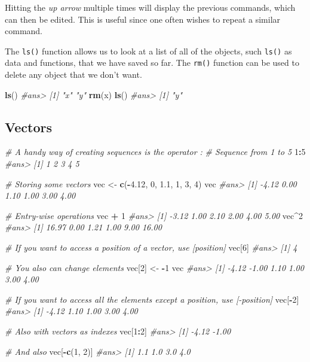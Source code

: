 \documentclass[]{book}
\newenvironment{Shaded}{\begin{snugshade}}{\end{snugshade}}
\newcommand{\KeywordTok}[1]{\textcolor[rgb]{0.13,0.29,0.53}{\textbf{#1}}}
\newcommand{\DecValTok}[1]{\textcolor[rgb]{0.00,0.00,0.81}{#1}}
\newcommand{\FloatTok}[1]{\textcolor[rgb]{0.00,0.00,0.81}{#1}}
\newcommand{\StringTok}[1]{\textcolor[rgb]{0.31,0.60,0.02}{#1}}
\newcommand{\CommentTok}[1]{\textcolor[rgb]{0.56,0.35,0.01}{\textit{#1}}}
\newcommand{\OperatorTok}[1]{\textcolor[rgb]{0.81,0.36,0.00}{\textbf{#1}}}
\newcommand{\NormalTok}[1]{#1}
\begin{document}
Hitting the \emph{up arrow} multiple times will display the previous
commands, which can then be edited. This is useful since one often
wishes to repeat a similar command.

The \texttt{ls()} function allows us to look at a list of all of the
objects, such \texttt{ls()} as data and functions, that we have saved so
far. The \texttt{rm()} function can be used to delete any object that we
don't want.

\begin{Shaded}
\begin{Highlighting}[]
\KeywordTok{ls}\NormalTok{()}
\CommentTok{#ans> [1] "x" "y"}
\KeywordTok{rm}\NormalTok{(x)}
\KeywordTok{ls}\NormalTok{()}
\CommentTok{#ans> [1] "y"}
\end{Highlighting}
\end{Shaded}

\subsection{Vectors}\label{vectors}

\begin{Shaded}
\begin{Highlighting}[]

\CommentTok{# A handy way of creating sequences is the operator :}
\CommentTok{# Sequence from 1 to 5}
\DecValTok{1}\OperatorTok{:}\DecValTok{5}
\CommentTok{#ans> [1] 1 2 3 4 5}

\CommentTok{# Storing some vectors}
\NormalTok{vec <-}\StringTok{ }\KeywordTok{c}\NormalTok{(}\OperatorTok{-}\FloatTok{4.12}\NormalTok{, }\DecValTok{0}\NormalTok{, }\FloatTok{1.1}\NormalTok{, }\DecValTok{1}\NormalTok{, }\DecValTok{3}\NormalTok{, }\DecValTok{4}\NormalTok{)}
\NormalTok{vec}
\CommentTok{#ans> [1] -4.12  0.00  1.10  1.00  3.00  4.00}

\CommentTok{# Entry-wise operations}
\NormalTok{vec }\OperatorTok{+}\StringTok{ }\DecValTok{1}
\CommentTok{#ans> [1] -3.12  1.00  2.10  2.00  4.00  5.00}
\NormalTok{vec}\OperatorTok{^}\DecValTok{2}
\CommentTok{#ans> [1] 16.97  0.00  1.21  1.00  9.00 16.00}

\CommentTok{# If you want to access a position of a vector, use [position]}
\NormalTok{vec[}\DecValTok{6}\NormalTok{]}
\CommentTok{#ans> [1] 4}

\CommentTok{# You also can change elements}
\NormalTok{vec[}\DecValTok{2}\NormalTok{] <-}\StringTok{ }\OperatorTok{-}\DecValTok{1}
\NormalTok{vec}
\CommentTok{#ans> [1] -4.12 -1.00  1.10  1.00  3.00  4.00}

\CommentTok{# If you want to access all the elements except a position, use [-position]}
\NormalTok{vec[}\OperatorTok{-}\DecValTok{2}\NormalTok{]}
\CommentTok{#ans> [1] -4.12  1.10  1.00  3.00  4.00}

\CommentTok{# Also with vectors as indexes}
\NormalTok{vec[}\DecValTok{1}\OperatorTok{:}\DecValTok{2}\NormalTok{]}
\CommentTok{#ans> [1] -4.12 -1.00}

\CommentTok{# And also}
\NormalTok{vec[}\OperatorTok{-}\KeywordTok{c}\NormalTok{(}\DecValTok{1}\NormalTok{, }\DecValTok{2}\NormalTok{)]}
\CommentTok{#ans> [1] 1.1 1.0 3.0 4.0}
\end{Highlighting}
\end{Shaded}
\end{document}
